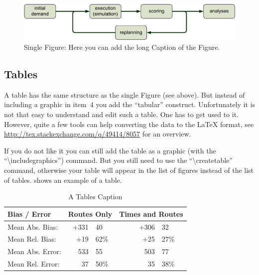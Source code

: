\begin{figure}%
\caption{Single Figure: Here you can add the long Caption of the Figure.}%
\label{fig:labelOfTheSingleFigure}%
\includegraphics[width=1.0\textwidth]{figures/MATSimLoop}%
\ivthline
\end{figure}

\subsection{Tables} \label{sec:compStructs-Tables}

A table has the same structure as the single Figure (see above). But
instead of including a graphic in item~4 you add the ``tabular''
construct.
Unfortunately it is not that easy to understand and edit such a table. One has
to get used to it. 
However, quite a few tools can help converting the data
to the \LaTeX{} format,
see \url{http://tex.stackexchange.com/q/49414/8057}
for an overview.

If you do not like it you can still add the table
as a graphic (with the ``\textbackslash{}includegraphics'') command.
But you still need
to use the ``\textbackslash{}createtable'' command,
otherwise your table will appear
in the list of figures instead of the list of tables.
 shows an example of a table.

\begin{table}[!ht]
\caption{A Tables  Caption}
\label{tab:labelOfTheTable}%

\begin{tabular}[c]{lr@{.}lcr@{.}l}
    \toprule
    Bias / Error     & \multicolumn{2}{c}{Routes Only} &
\multicolumn{3}{c}{Times and Routes} \\
    \midrule
    Mean Abs. Bias:  & $+$331&40                        && $+$306&32  
                         \\
    Mean Rel. Bias:  &  $+$19&62\%                      &&  $+$25&27\%
                         \\
    \midrule
    Mean Abs. Error: &    533&55                        &&    503&77  
                         \\
    Mean Rel. Error: &     37&50\%                      &&     35&38\%
                         \\
    \bottomrule
  \end{tabular}

\ivthline
\end{table}


